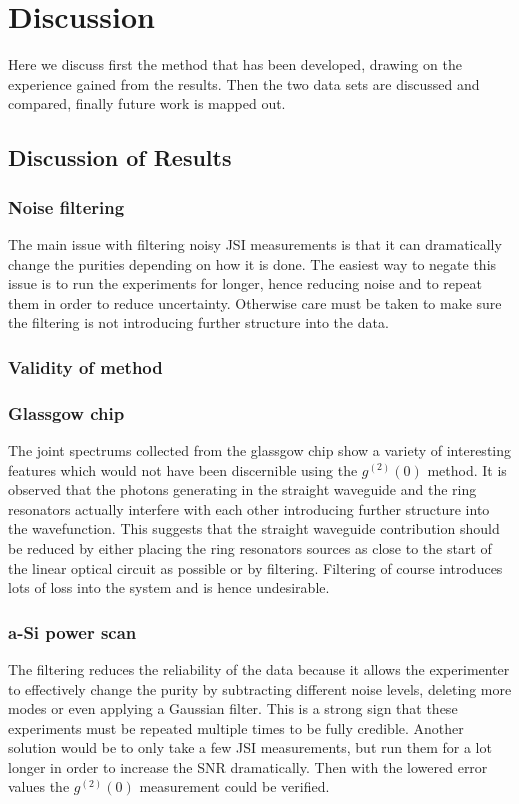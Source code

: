 \newpage
\section{Discussion}
Here we discuss first the method that has been developed, drawing on the experience gained from the results. Then the two data sets are discussed and compared, finally future work is mapped out.
\subsection{Discussion of Results}
\subsubsection{Noise filtering}
The main issue with filtering noisy JSI measurements is that it can dramatically change the purities depending on how it is done. The easiest way to negate this issue is to run the experiments for longer, hence reducing noise and to repeat them in order to reduce uncertainty. Otherwise care must be taken to make sure the filtering is not introducing further structure into the data.

\subsubsection{Validity of method}
\subsubsection{Glassgow chip}
The joint spectrums collected from the glassgow chip show a variety of interesting features which would not have been discernible using the $g^{(2)}(0)$ method. It is observed that the photons generating in the straight waveguide and the ring resonators actually interfere with each other introducing further structure into the wavefunction. This suggests that the straight waveguide contribution should be reduced by either placing the ring resonators sources as close to the start of the linear optical circuit as possible or by filtering. Filtering of course introduces lots of loss into the system and is hence undesirable. 
\subsubsection{a-Si power scan}
The filtering reduces the reliability of the data because it allows the experimenter to effectively change the purity by subtracting different noise levels, deleting more modes or even applying a Gaussian filter. This is a strong sign that these experiments must be repeated multiple times to be fully credible. Another solution would be to only take a few JSI measurements, but run them for a lot longer in order to increase the SNR dramatically. Then with the lowered error values the $g^{(2)}(0)$ measurement could be verified. 
